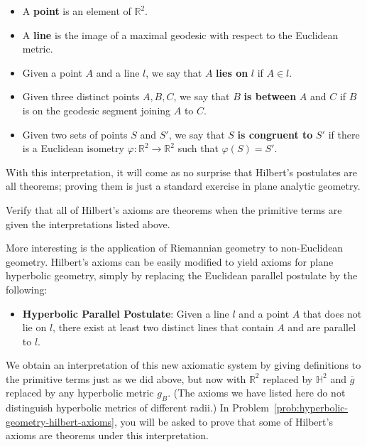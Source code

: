 \begin{itemize}
\item A \textbf{point} is an element of $\mathbb{R}^2$.
\item A \textbf{line} is the image of a maximal geodesic with respect to the Euclidean metric.
\item Given a point $A$ and a line $l$, we say that $A$ \textbf{lies on} $l$ if $A \in l$.
\item Given three distinct points $A, B, C$, we say that $B$ \textbf{is between} $A$ and $C$ if $B$ is on the geodesic segment joining $A$ to $C$.
\item Given two sets of points $S$ and $S'$, we say that $S$ \textbf{is congruent to} $S'$ if there is a Euclidean isometry $\varphi: \mathbb{R}^2 \to \mathbb{R}^2$ such that $\varphi(S) = S'$.
\end{itemize}

With this interpretation, it will come as no surprise that Hilbert's postulates are all theorems; proving them is just a standard exercise in plane analytic geometry.

\begin{exercise}
\label{exer:hilbert-axioms-euclidean-plane}

Verify that all of Hilbert's axioms are theorems when the primitive terms are given the interpretations listed above.
\end{exercise}

More interesting is the application of Riemannian geometry to non-Euclidean geometry. Hilbert's axioms can be easily modified to yield axioms for plane hyperbolic geometry, simply by replacing the Euclidean parallel postulate by the following:

\begin{itemize}
\item \textbf{Hyperbolic Parallel Postulate}: Given a line $l$ and a point $A$ that does not lie on $l$, there exist at least two distinct lines that contain $A$ and are parallel to $l$.
\end{itemize}

We obtain an interpretation of this new axiomatic system by giving definitions to the primitive terms just as we did above, but now with $\mathbb{R}^2$ replaced by $\mathbb{H}^2$ and $\overline{g}$ replaced by any hyperbolic metric $g_B$. (The axioms we have listed here do not distinguish hyperbolic metrics of different radii.) In Problem~\ref{prob:hyperbolic-geometry-hilbert-axioms}, you will be asked to prove that some of Hilbert's axioms are theorems under this interpretation.


